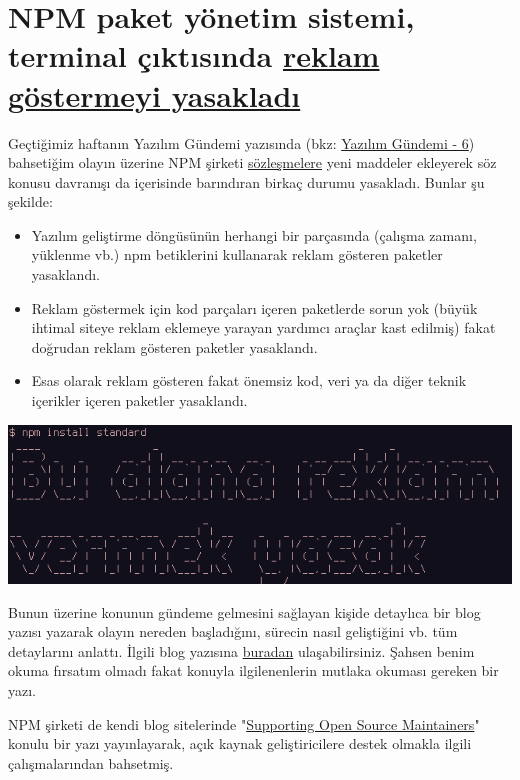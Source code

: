 \documentclass[11pt]{article}
\begin{document}
\section{NPM paket yönetim sistemi, terminal çıktısında \href{https://www.zdnet.com/article/npm-bans-terminal-ads/}{reklam göstermeyi yasakladı}}
\label{sec:orgbb24a08}
Geçtiğimiz haftanın Yazılım Gündemi yazısında (bkz: \href{../06/yazilim-gundemi-06.pdf}{Yazılım Gündemi - 6})
bahsetiğim olayın üzerine NPM şirketi \href{https://www.npmjs.com/policies/open-source-terms\#commercial-content}{sözleşmelere} yeni maddeler ekleyerek söz
konusu davranışı da içerisinde barındıran birkaç durumu yasakladı. Bunlar şu
şekilde:

\begin{itemize}
\item Yazılım geliştirme döngüsünün herhangi bir parçasında (çalışma zamanı,
yüklenme vb.) npm betiklerini kullanarak reklam gösteren paketler
yasaklandı.
\item Reklam göstermek için kod parçaları içeren paketlerde sorun yok (büyük
ihtimal siteye reklam eklemeye yarayan yardımcı araçlar kast edilmiş)
fakat doğrudan reklam gösteren paketler yasaklandı.
\item Esas olarak reklam gösteren fakat önemsiz kod, veri ya da diğer teknik
içerikler içeren paketler yasaklandı.
\end{itemize}

\begin{center}
\includegraphics[width=.9\linewidth]{gorseller/reklam-yasak.png}
\end{center}

Bunun üzerine konunun gündeme gelmesini sağlayan kişide detaylıca bir blog
yazısı yazarak olayın nereden başladığını, sürecin nasıl geliştiğini vb. tüm
detaylarını anlattı. İlgili blog yazısına \href{https://feross.org/funding-experiment-recap/}{buradan} ulaşabilirsiniz. Şahsen benim
okuma fırsatım olmadı fakat konuyla ilgilenenlerin mutlaka okuması gereken bir
yazı.

NPM şirketi de kendi blog sitelerinde "\href{https://blog.npmjs.org/post/187382017885/supporting-open-source-maintainers}{Supporting Open Source Maintainers}"
konulu bir yazı yayınlayarak, açık kaynak geliştiricilere destek olmakla ilgili
çalışmalarından bahsetmiş.
\end{document}
